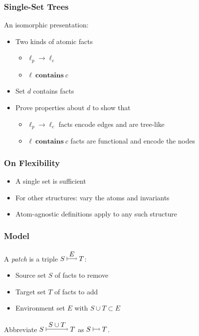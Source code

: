 \documentclass{beamer}
\begin{document}
\newcommand{\fcontains}{\ \mathbf{contains}\ }
\begin{frame}
    \frametitle{Single-Set Trees}
    An isomorphic presentation:
    \begin{itemize}
        \item Two kinds of atomic facts
            \begin{itemize}
                \item $\ell_p \to \ell_c$
                \item $\ell \fcontains c$
            \end{itemize}
        \item Set $d$ contains facts
        \item Prove properties about $d$ to show that
            \begin{itemize}
                \item $\ell_p \to \ell_c$ facts encode edges and are tree-like
                \item $\ell \fcontains c$ facts are functional and encode the nodes
            \end{itemize}
    \end{itemize}
\end{frame}

\begin{frame}
    \frametitle{On Flexibility}
    \begin{itemize}
        \item A single set is sufficient
        \item For other structures: vary the atoms and invariants
        \item Atom-agnostic definitions apply to any such structure
    \end{itemize}
\end{frame}

\newcommand{\patch}[1]{\mathrel{\tikz\draw[|->]
    node (T) {$#1$}
    (T.south) node {} %
    (T.south west) -- (T.south east)
    ;}}
\newcommand{\dpatch}{\patch\ }
\begin{frame}
    \frametitle{Model}
    A \emph{patch} is a triple $S \patch E T$:
    \begin{itemize}
        \item Source set $S$ of facts to remove
        \item Target set $T$ of facts to add
        \item Environment set $E$ with $S \cup T \subset E$
    \end{itemize}

    \vpause

    Abbreviate $S \patch{S \cup T} T$ as $S \dpatch T$.
\end{frame}
\end{document}
